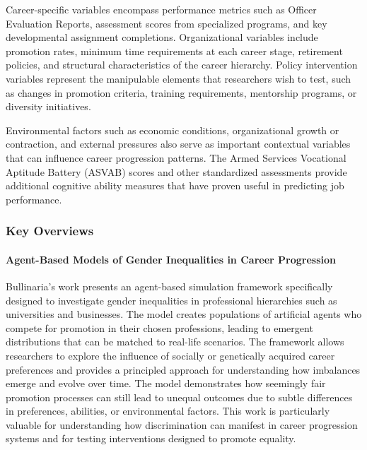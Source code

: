\documentclass[main.tex]{subfiles}
\begin{document}
Career-specific variables encompass performance metrics such as Officer Evaluation Reports, assessment scores from specialized programs, and key developmental assignment completions\autocite{potential-indicators}. Organizational variables include promotion rates, minimum time requirements at each career stage, retirement policies, and structural characteristics of the career hierarchy\autocite{bullinaria2018, career-model}. Policy intervention variables represent the manipulable elements that researchers wish to test, such as changes in promotion criteria, training requirements, mentorship programs, or diversity initiatives\autocite{wilensky2023, furtado2023}.

Environmental factors such as economic conditions, organizational growth or contraction, and external pressures also serve as important contextual variables that can influence career progression patterns\autocite{duc2015, bronka2023}. The Armed Services Vocational Aptitude Battery (ASVAB) scores and other standardized assessments provide additional cognitive ability measures that have proven useful in predicting job performance\autocite{potential-indicators}.

\subsubsection{Key Overviews}

\paragraph{Agent-Based Models of Gender Inequalities in Career Progression}

Bullinaria's work presents an agent-based simulation framework specifically designed to investigate gender inequalities in professional hierarchies such as universities and businesses\autocite{bullinaria2018}. The model creates populations of artificial agents who compete for promotion in their chosen professions, leading to emergent distributions that can be matched to real-life scenarios. The framework allows researchers to explore the influence of socially or genetically acquired career preferences and provides a principled approach for understanding how imbalances emerge and evolve over time. The model demonstrates how seemingly fair promotion processes can still lead to unequal outcomes due to subtle differences in preferences, abilities, or environmental factors. This work is particularly valuable for understanding how discrimination can manifest in career progression systems and for testing interventions designed to promote equality.
\end{document}
